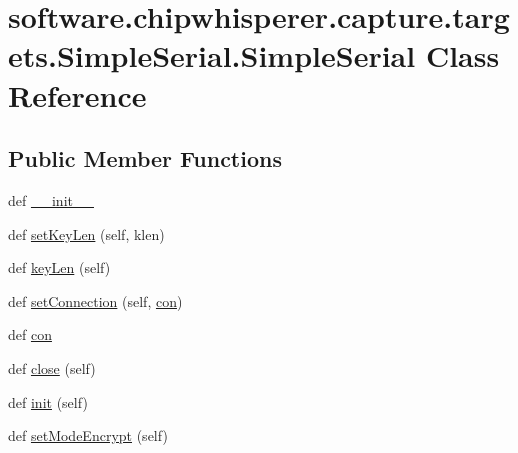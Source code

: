 \hypertarget{classsoftware_1_1chipwhisperer_1_1capture_1_1targets_1_1SimpleSerial_1_1SimpleSerial}{}\section{software.\+chipwhisperer.\+capture.\+targets.\+Simple\+Serial.\+Simple\+Serial Class Reference}
\label{classsoftware_1_1chipwhisperer_1_1capture_1_1targets_1_1SimpleSerial_1_1SimpleSerial}
\subsection*{Public Member Functions}
\begin{DoxyCompactItemize}
\item 
def \hyperlink{classsoftware_1_1chipwhisperer_1_1capture_1_1targets_1_1SimpleSerial_1_1SimpleSerial_a30c505f4733a556535b9380e3b039ed3}{\+\_\+\+\_\+init\+\_\+\+\_\+}
\item 
def \hyperlink{classsoftware_1_1chipwhisperer_1_1capture_1_1targets_1_1SimpleSerial_1_1SimpleSerial_ae446da4c983bc9b1f5d8a27f7dab02ae}{set\+Key\+Len} (self, klen)
\item 
def \hyperlink{classsoftware_1_1chipwhisperer_1_1capture_1_1targets_1_1SimpleSerial_1_1SimpleSerial_a690b4ad0dc37ba844f883fa7e87e9cb8}{key\+Len} (self)
\item 
def \hyperlink{classsoftware_1_1chipwhisperer_1_1capture_1_1targets_1_1SimpleSerial_1_1SimpleSerial_a3b08d4de493cab1d7cca7038520270f2}{set\+Connection} (self, \hyperlink{classsoftware_1_1chipwhisperer_1_1capture_1_1targets_1_1SimpleSerial_1_1SimpleSerial_a26b0dfc037780b36e658cc1c0bb88526}{con})
\item 
def \hyperlink{classsoftware_1_1chipwhisperer_1_1capture_1_1targets_1_1SimpleSerial_1_1SimpleSerial_a26b0dfc037780b36e658cc1c0bb88526}{con}
\item 
def \hyperlink{classsoftware_1_1chipwhisperer_1_1capture_1_1targets_1_1SimpleSerial_1_1SimpleSerial_a8812b6ae1234e86f83abe9fae638a6b6}{close} (self)
\item 
def \hyperlink{classsoftware_1_1chipwhisperer_1_1capture_1_1targets_1_1SimpleSerial_1_1SimpleSerial_addb308a8168102acd056d41a4e088a5f}{init} (self)
\item 
def \hyperlink{classsoftware_1_1chipwhisperer_1_1capture_1_1targets_1_1SimpleSerial_1_1SimpleSerial_ab596e65731c099d371c541bb8700d76f}{set\+Mode\+Encrypt} (self)

\end{DoxyCompactItemize}
